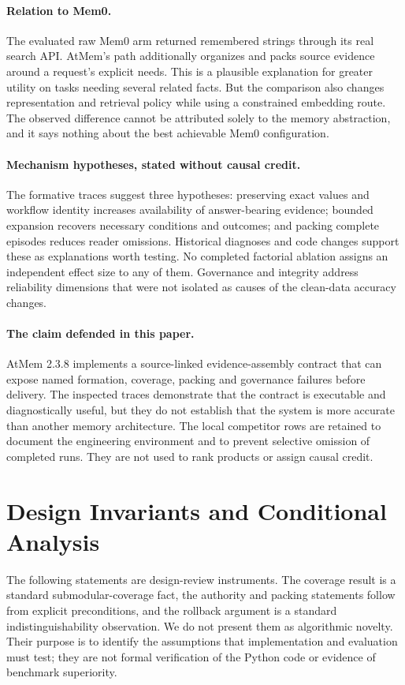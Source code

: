 \documentclass[10pt,twocolumn]{article}
\begin{document}
\paragraph{Relation to Mem0.}
The evaluated raw Mem0 arm returned remembered strings through its real search API. AtMem's path additionally organizes and packs source evidence around a request's explicit needs. This is a plausible explanation for greater utility on tasks needing several related facts. But the comparison also changes representation and retrieval policy while using a constrained embedding route. The observed difference cannot be attributed solely to the memory abstraction, and it says nothing about the best achievable Mem0 configuration.

\paragraph{Mechanism hypotheses, stated without causal credit.}
The formative traces suggest three hypotheses: preserving exact values and workflow identity increases availability of answer-bearing evidence; bounded expansion recovers necessary conditions and outcomes; and packing complete episodes reduces reader omissions. Historical diagnoses and code changes support these as explanations worth testing. No completed factorial ablation assigns an independent effect size to any of them. Governance and integrity address reliability dimensions that were not isolated as causes of the clean-data accuracy changes.

\paragraph{The claim defended in this paper.}
AtMem 2.3.8 implements a source-linked evidence-assembly contract that can expose named formation, coverage, packing and governance failures before delivery. The inspected traces demonstrate that the contract is executable and diagnostically useful, but they do not establish that the system is more accurate than another memory architecture. The local competitor rows are retained to document the engineering environment and to prevent selective omission of completed runs. They are not used to rank products or assign causal credit.

\section{Design Invariants and Conditional Analysis}
\label{sec:formal}
The following statements are design-review instruments. The coverage result is a standard submodular-coverage fact, the authority and packing statements follow from explicit preconditions, and the rollback argument is a standard indistinguishability observation. We do not present them as algorithmic novelty. Their purpose is to identify the assumptions that implementation and evaluation must test; they are not formal verification of the Python code or evidence of benchmark superiority.
\end{document}
